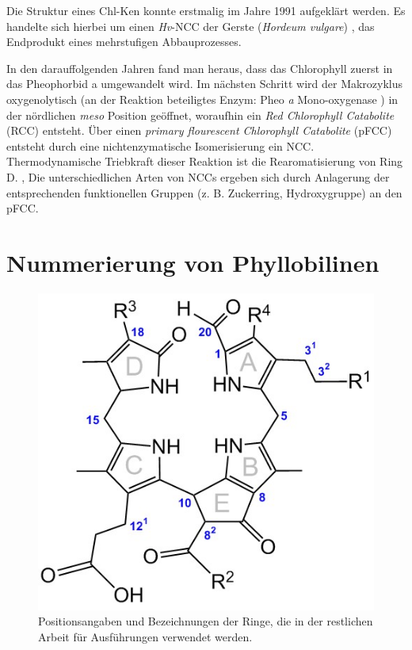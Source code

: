 Die Struktur eines \gls{Chl-K}en konnte erstmalig im Jahre 1991 aufgeklärt werden. Es handelte sich hierbei um einen \textit{Hv}-NCC der Gerste (\textit{Hordeum vulgare}) \cite{ErsterKatabolit}, das Endprodukt eines mehrstufigen Abbauprozesses. 

In den darauffolgenden Jahren fand man heraus, dass das Chlorophyll zuerst in das Pheophorbid a umgewandelt wird. Im nächsten Schritt wird der Makrozyklus oxygenolytisch (an der Reaktion beteiligtes Enzym: Pheo \textit{a} Mono-oxygenase \cite{ChlorophyllCatabolitesEnzyme}) in der nördlichen \textit{meso} Position geöffnet, woraufhin ein \textit{Red Chlorophyll Catabolite} (RCC) entsteht. 
Über einen \textit{primary flourescent Chlorophyll Catabolite} (pFCC) entsteht durch eine nichtenzymatische Isomerisierung ein \gls{NCC}. Thermodynamische Triebkraft dieser Reaktion ist die Rearomatisierung von Ring D. \cite{FCCKatabolit}, \cite{ChlorophyllCatabolites} Die unterschiedlichen Arten von \gls{NCC}s ergeben sich durch Anlagerung der entsprechenden funktionellen Gruppen (z. B. Zuckerring, Hydroxygruppe) an den pFCC. \cite{ChlorophyllCatabolites} 

\section{Nummerierung von Phyllobilinen}

\begin{figure}[!hbtp]
  \centering
  \includegraphics[scale=0.61]{figures/Kapitel2/VWA_Chl-Nummerierung.png}
  \caption[Nummerierung von Phyllobilinen, Quelle: Mathias Scherl]{Positionsangaben und Bezeichnungen der Ringe, die in der restlichen Arbeit für Ausführungen verwendet werden.}
  \label{fig:NummerierungPhyllobiline}
\end{figure}



